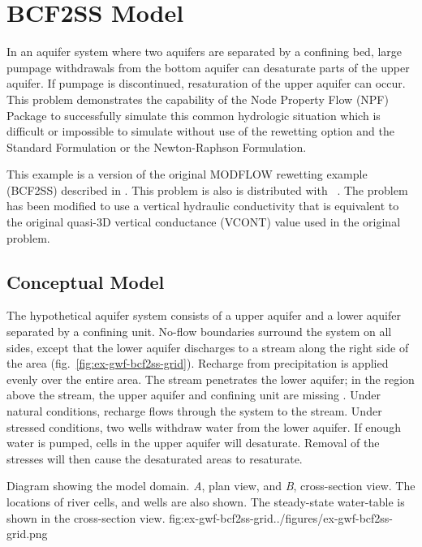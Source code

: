 \section{BCF2SS Model}

In an aquifer system where two aquifers are separated by a confining bed, large pumpage withdrawals from the bottom aquifer can desaturate parts of the upper aquifer. If pumpage is discontinued, resaturation of the upper aquifer can occur. This problem demonstrates the capability of the Node Property Flow (NPF) Package to successfully simulate this common hydrologic situation which is difficult or impossible to simulate without use of the rewetting option and the Standard Formulation or the Newton-Raphson Formulation.

This example is a version of the original MODFLOW rewetting example (BCF2SS) described in \cite{mcdonaldetal1991wetdry}. This problem is also is distributed with \mff~\citep{modflow2005}. The problem has been modified to use a vertical hydraulic conductivity that is equivalent to the original quasi-3D vertical conductance (VCONT) value used in the original problem.


\subsection{Conceptual Model}

The hypothetical aquifer system consists of a upper aquifer and a lower aquifer separated by a confining unit. No-flow boundaries surround the system on all sides, except that the lower aquifer discharges to a stream along the right side of the area (fig.~\ref{fig:ex-gwf-bcf2ss-grid}). Recharge from precipitation is applied evenly over the entire area. The stream penetrates the lower aquifer; in the region above the stream, the upper aquifer and confining unit are missing  \cite[see][figure~1]{mcdonaldetal1991wetdry}. Under natural conditions, recharge flows through the system to the stream. Under stressed conditions, two wells withdraw water from the lower aquifer. If enough water is pumped, cells in the upper aquifer will desaturate. Removal of the stresses will then cause the desaturated areas to resaturate.


\begin{StandardFigure}{
                                     Diagram showing the model domain. \textit{A}, plan view, and \textit{B}, cross-section 
                                     view. The locations of river cells, and wells are also shown. The steady-state water-table
                                     is shown in the cross-section view.
                                     }{fig:ex-gwf-bcf2ss-grid}{../figures/ex-gwf-bcf2ss-grid.png}
\end{StandardFigure}                                 

